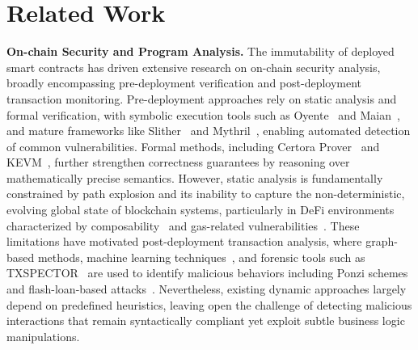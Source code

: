
\section{Related Work}
\label{sec:related_work}


\textbf{On-chain Security and Program Analysis.}
The immutability of deployed smart contracts has driven extensive research on on-chain security analysis, broadly encompassing pre-deployment verification and post-deployment transaction monitoring. Pre-deployment approaches rely on static analysis and formal verification, with symbolic execution tools such as Oyente~\cite{Luu2016Making} and Maian~\cite{Nikolic2018Finding}, and mature frameworks like Slither~\cite{slither} and Mythril~\cite{mythril2018}, enabling automated detection of common vulnerabilities. Formal methods, including Certora Prover~\cite{certoraProver} and KEVM~\cite{Hildenbrandt2018KEVM}, further strengthen correctness guarantees by reasoning over mathematically precise semantics. However, static analysis is fundamentally constrained by path explosion and its inability to capture the non-deterministic, evolving global state of blockchain systems, particularly in DeFi environments characterized by composability~\cite{defi2023} and gas-related vulnerabilities~\cite{MadMax}. These limitations have motivated post-deployment transaction analysis, where graph-based methods, machine learning techniques~\cite{mythischaikul2023machine}, and forensic tools such as TXSPECTOR~\cite{TXSPECTOR} are used to identify malicious behaviors including Ponzi schemes and flash-loan-based attacks~\cite{zhou2021flashboys}. Nevertheless, existing dynamic approaches largely depend on predefined heuristics, leaving open the challenge of detecting malicious interactions that remain syntactically compliant yet exploit subtle business logic manipulations.


